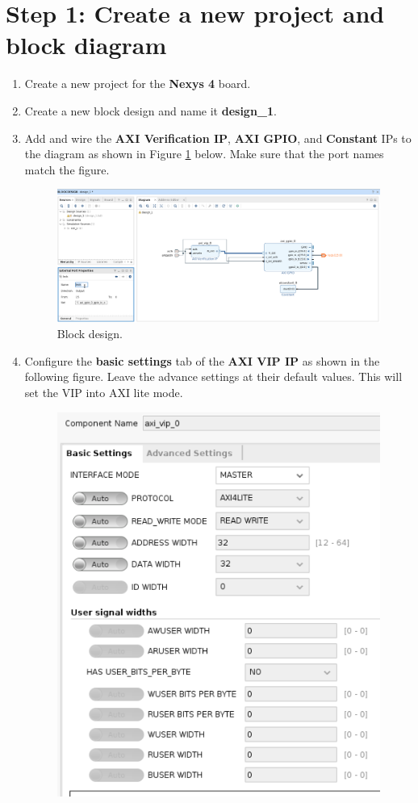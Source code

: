 \documentclass[12pt]{article}
\begin{document}
\section*{Step 1: Create a new project and block diagram}
\begin{enumerate}
	\item Create a new project for the \textbf{Nexys 4} board.
	\item Create a new block design and name it \textbf{design\_1}.
	\item Add and wire the \textbf{AXI Verification IP}, \textbf{AXI GPIO}, and \textbf{Constant} IPs to the diagram as shown in Figure \ref{fig:bd} below. Make sure that the port names match the figure.
		\begin{figure}[h]
		  \centering
		  \includegraphics[width=\textwidth]{bd.png}
		  \caption{Block design.}
		  \label{fig:bd}
		\end{figure}
	\item Configure the \textbf{basic settings} tab of the \textbf{AXI VIP IP} as shown in the following figure. Leave the advance settings at their default values. This will set the VIP into AXI lite mode. 
		\begin{figure}[H]
		  \centering
		  \includegraphics[scale=0.5]{axivipconfig.png}

\end{figure}
\end{enumerate}
\end{document}
